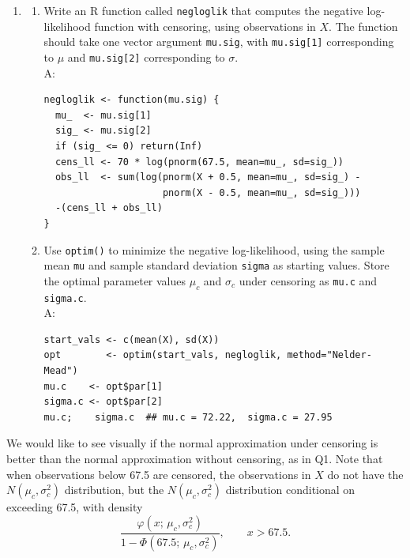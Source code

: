 \documentclass{article}
\begin{document}
\begin{enumerate}
  \item[$\boldsymbol{Q_9}$]
    \begin{enumerate}
      \item[(a)] Write an R function called \texttt{negloglik} that computes the negative log-likelihood function with censoring, using observations in $X$. The function should take one vector argument \texttt{mu.sig}, with \texttt{mu.sig[1]} corresponding to $\mu$ and \texttt{mu.sig[2]} corresponding to $\sigma$. \\A:
\begin{lstlisting}
negloglik <- function(mu.sig) {
  mu_  <- mu.sig[1]
  sig_ <- mu.sig[2]
  if (sig_ <= 0) return(Inf)
  cens_ll <- 70 * log(pnorm(67.5, mean=mu_, sd=sig_))
  obs_ll  <- sum(log(pnorm(X + 0.5, mean=mu_, sd=sig_) -
                     pnorm(X - 0.5, mean=mu_, sd=sig_)))
  -(cens_ll + obs_ll)
}
\end{lstlisting}

      \item[(b)] Use \texttt{optim()} to minimize the negative log-likelihood, using the sample mean \texttt{mu} and sample standard deviation \texttt{sigma} as starting values. Store the optimal parameter values $\mu_c$ and $\sigma_c$ under censoring as \texttt{mu.c} and \texttt{sigma.c}. \\A:

\begin{lstlisting}
start_vals <- c(mean(X), sd(X))
opt        <- optim(start_vals, negloglik, method="Nelder-Mead")
mu.c    <- opt$par[1]
sigma.c <- opt$par[2]
mu.c;    sigma.c  ## mu.c = 72.22,  sigma.c = 27.95
\end{lstlisting}
    \end{enumerate}
\end{enumerate}

\newpage
We would like to see visually if the normal approximation under censoring is better than the normal approximation without censoring, as in Q1. Note that when observations below 67.5 are censored, the observations in $X$ do not have the $N(\mu_c, \sigma_c^2)$ distribution, but the $N(\mu_c, \sigma_c^2)$ distribution conditional on exceeding 67.5, with density
\[
  \frac{\varphi(x;\,\mu_c,\sigma_c^2)}{1 - \Phi(67.5;\,\mu_c,\sigma_c^2)}, \qquad x > 67.5.
\]
\end{document}
